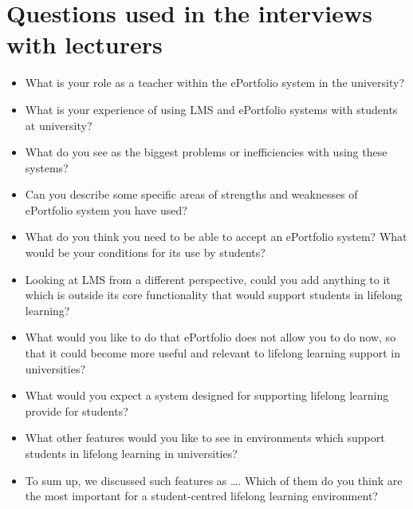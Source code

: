 \section{Questions used in the interviews with lecturers}
\label{sec:appquestlect}
\begin{itemize}
\item What is your role as a teacher within the ePortfolio system in the
university?

\item What is your experience of using LMS and ePortfolio systems with students
at university?

\item What do you see as the biggest problems or inefficiencies with using these
systems?

\item Can you describe some specific areas of strengths and weaknesses of
ePortfolio system you have used?

\item What do you think you need to be able to accept an ePortfolio system? What
would be your conditions for its use by students?

\item Looking at LMS from a different perspective, could you add anything to it
which is outside its core functionality that would support students in lifelong
learning?

\item What would you like to do that ePortfolio does not allow you to do now, so
that it could become more useful and relevant to lifelong learning support in
universities?

\item What would you expect a system designed for supporting lifelong learning
provide for students?

\item What other features would you like to see in environments which support
students in lifelong learning in universities?

\item To sum up, we discussed such features as \ldots. Which of them do you
think are the most important for a student-centred lifelong learning environment?
\end{itemize}



